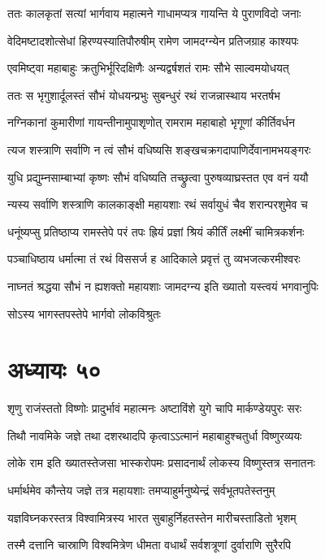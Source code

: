 \twolineshloka
{ततः कालकृतां सत्यां भार्गवाय महात्मने}
{गाधामप्यत्र गायन्ति ये पुराणविदो जनाः}


\twolineshloka
{वेदिमष्टादशोत्सेधां हिरण्यस्यातिपौरुषीम्}
{रामेण जामदग्न्येन प्रतिजग्राह काश्यपः}


\twolineshloka
{एवमिष्ट्वा महाबाहुः क्रतुभिर्भूरिदक्षिणैः}
{अन्यद्वर्षशतं रामः सौभे साल्वमयोधयत्}


\twolineshloka
{ततः स भृगुशार्दूलस्तं सौभं योधयन्प्रभुः}
{सुबन्धुरं रथं राजन्नास्थाय भरतर्षभ}


\twolineshloka
{नग्निकानां कुमारीणां गायन्तीनामुपाशृणोत्}
{रामराम महाबाहो भृगूणां कीर्तिवर्धन}


\twolineshloka
{त्यज शस्त्राणि सर्वाणि न त्वं सौभं वधिष्यसि}
{शङ्खचक्रगदापाणिर्देवानामभयङ्गरः}


\twolineshloka
{युधि प्रद्युम्नसाम्बाभ्यां कृष्णः सौभं वधिष्यति}
{तच्छ्रुत्वा पुरुषव्याघ्रस्तत एव वनं ययौ}


\twolineshloka
{न्यस्य सर्वाणि शस्त्राणि कालकाङ्क्षी महायशाः}
{रथं सर्वायुधं चैव शरान्परशुमेव च}


\twolineshloka
{धनूंष्यप्सु प्रतिष्ठाप्य रामस्तेपे परं तपः}
{ह्रियं प्रज्ञां श्रियं कीर्तिं लक्ष्मीं चामित्रकर्शनः}


\twolineshloka
{पञ्चाधिष्ठाय धर्मात्मा तं रथं विससर्ज ह}
{आदिकाले प्रवृत्तं तु व्यभजत्करमीश्वरः}


\threelineshloka
{नाघ्नतं श्रद्धया सौभं न ह्यशक्तो महायशाः}
{जामदग्न्य इति ख्यातो यस्त्वयं भगवानुपिः}
{}


सोऽस्य भागस्तपस्तेपे भार्गवो लोकविश्रुतः
\chapter{अध्यायः ५०}
\twolineshloka
{शृणु राजंस्ततो विष्णोः प्रादुर्भावं महात्मनः}
{अष्टाविंशे युगे चापि मार्कण्डेयपुरः सरः}


\twolineshloka
{तिथौ नावमिके जज्ञे तथा दशरथादपि}
{कृत्वाऽऽत्मानं महाबाहुश्चतुर्धा विष्णुरव्ययः}


\twolineshloka
{लोके राम इति ख्यातस्तेजसा भास्करोपमः}
{प्रसादनार्थं लोकस्य विष्णुस्तत्र सनातनः}


\twolineshloka
{धर्मार्थमेव कौन्तेय जज्ञे तत्र महायशाः}
{तमप्याहुर्मनुष्येन्द्रं सर्वभूतपतेस्तनुम्}


\twolineshloka
{यज्ञविघ्नकरस्तत्र विश्वामित्रस्य भारत}
{सुबाहुर्निहतस्तेन मारीचस्ताडितो भृशम्}


\twolineshloka
{तस्मै दत्तानि चास्राणि विश्वमित्रेण धीमता}
{वधार्थं सर्वशत्रूणां दुर्वाराणि सुरैरपि}


